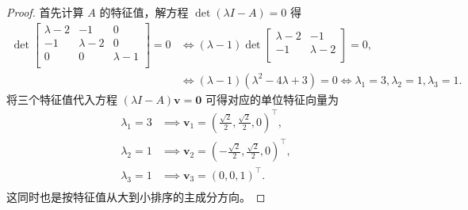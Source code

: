 \begin{proof}
首先计算 $A$ 的特征值，解方程 $\det \left(\lambda I - A\right) = 0$ 得 \[
\begin{aligned}
    \det\begin{bmatrix}
        \lambda - 2 & -1 & 0 \\
        -1 & \lambda - 2 & 0 \\
        0 & 0 & \lambda - 1 \\
    \end{bmatrix} = 0 &\iff \left(\lambda - 1\right) \det\begin{bmatrix}
        \lambda - 2 & -1 \\
        -1 & \lambda - 2 \\
    \end{bmatrix} = 0, \\
    &\iff \left(\lambda - 1\right) \left(\lambda^2 - 4\lambda + 3\right) = 0 \iff \boxed{\lambda_1 = 3, \lambda_2 = 1, \lambda_3 = 1}.
\end{aligned}
\]
将三个特征值代入方程 $\left(\lambda I - A\right) \boldsymbol{v} = \boldsymbol{0}$ 可得对应的单位特征向量为 \[
\begin{aligned}
    \lambda_1 = 3 &\implies \boxed{\boldsymbol{v}_1 = \left(\frac{\sqrt{2}}{2}, \frac{\sqrt{2}}{2}, 0\right)^\top}, \\
    \lambda_2 = 1 &\implies \boxed{\boldsymbol{v}_2 = \left(-\frac{\sqrt{2}}{2}, \frac{\sqrt{2}}{2}, 0\right)^\top}, \\
    \lambda_3 = 1 &\implies \boxed{\boldsymbol{v}_3 = \left(0, 0, 1\right)^\top}. \\
\end{aligned}
\]
这同时也是按特征值从大到小排序的主成分方向。


\end{proof}
